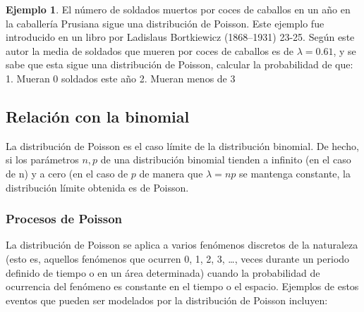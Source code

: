 \documentclass[]{book}
\theoremstyle{plain}
\theoremstyle{definition}
\newtheorem{example}[theorem]{Ejemplo}
\theoremstyle{definition} %
\begin{document}
\begin{example}
  El número de soldados muertos por coces de caballos en un año en la caballería Prusiana sigue una distribución de Poisson.
  Este ejemplo fue introducido 
  en un libro por Ladislaus Bortkiewicz (1868--1931) 23-25. 
  Según este autor la media de soldados que mueren por coces de caballos es de
\(\lambda = 0.61\), y se sabe que esta sigue una distribución de
Poisson, calcular la probabilidad de que: 1. Mueran 0 soldados este año
2. Mueran menos de 3
\end{example}

\hypertarget{relaciuxf3n-con-la-binomial}{%
\subsection{Relación con la
binomial}\label{relaciuxf3n-con-la-binomial}}

La distribución de Poisson es el caso límite de la distribución
binomial. De hecho, si los parámetros \(n, p\) de una distribución
binomial tienden a infinito (en el caso de n) y a cero (en el caso de
\(p\) de manera que \(\lambda = np\) se mantenga constante, la
distribución límite obtenida es de Poisson. 

\subsubsection{Procesos de Poisson}

La distribución de Poisson se aplica a varios fenómenos discretos de la
naturaleza (esto es, aquellos fenómenos que ocurren 0, 1, 2, 3,
\ldots{}, veces durante un periodo definido de tiempo o en un área
determinada) cuando la probabilidad de ocurrencia del fenómeno es
constante en el tiempo o el espacio. Ejemplos de estos eventos que
pueden ser modelados por la distribución de Poisson incluyen:
\end{document}
